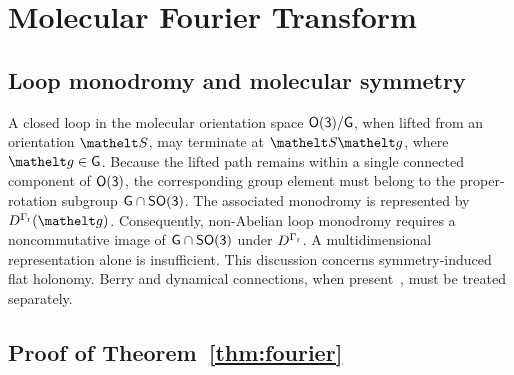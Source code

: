 \section{Molecular Fourier Transform}


\subsection{Loop monodromy and molecular symmetry}
\label{app:monodromy}

A closed loop in the molecular orientation space \(\mathsf{O(3)}/\mathsf{G}\), when lifted from an orientation \(\orient\), may terminate at \(\orient\gel\), where \(\gel\in \grp{G}\). Because the lifted path remains within a single connected component of \(\mathsf{O(3)}\), the corresponding group element must belong to the proper-rotation subgroup \(\mathsf{G}\cap\mathsf{SO(3)}\). The associated monodromy is represented by \(D^{\Grot}(\gel)\). Consequently, non-Abelian loop monodromy requires a noncommutative image of \(\mathsf{G}\cap\mathsf{SO(3)}\) under \(D^{\Gamma_{\mathrm{r}}}\). A multidimensional representation alone is insufficient. This discussion concerns symmetry-induced flat holonomy. Berry and dynamical connections, when present~\cite{Berry1984, Mead1992}, must be treated separately.







\subsection{Proof of Theorem~\ref{thm:fourier}} 
\label{proof:fourier}

